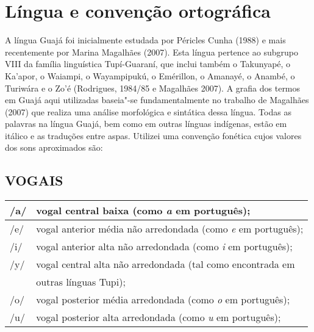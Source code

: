 
\chapter{Língua e convenção
ortográfica}\label{luxedngua-e-convenuxe7uxe3o-ortogruxe1fica}


\noindent A língua Guajá foi inicialmente estudada por Péricles Cunha (1988) e
mais recentemente por Marina Magalhães (2007). Esta língua pertence ao
subgrupo VIII da família linguística Tupí-Guaraní, que inclui também o
Takunyapé, o Ka'apor, o Waiampi, o Wayampipukú, o Emérillon, o Amanayé,
o Anambé, o Turiwára e o Zo'é (Rodrigues, 1984/85 e Magalhães 2007). A
grafia dos termos em Guajá aqui utilizadas baseia"-se fundamentalmente no
trabalho de Magalhães (2007) que realiza uma análise morfológica e
sintática dessa língua. Todas as palavras na língua Guajá, bem como em
outras línguas indígenas, estão em itálico e as traduções entre aspas.
Utilizei uma convenção fonética cujos valores dos sons aproximados são:

\section{VOGAIS}

\begin{table}[H]
\scriptsize
\centering
\begin{tabular}{|l|l|}
\hline
/a/ & vogal central baixa (como \emph{a} em português);                                       \\ \hline
/e/ & vogal anterior média não arredondada (como \emph{e} em português);                      \\ \hline
/i/ & vogal anterior alta não arredondada (como \emph{i} em português);                       \\ \hline
/y/ & vogal central alta não arredondada (tal como encontrada em \\ & outras línguas Tupi); \\ \hline
/o/ & vogal posterior média arredondada (como \emph{o} em português);                         \\ \hline
/u/ & vogal posterior alta arredondada (como \emph{u} em português);                          \\ \hline
\end{tabular}
\end{table}


